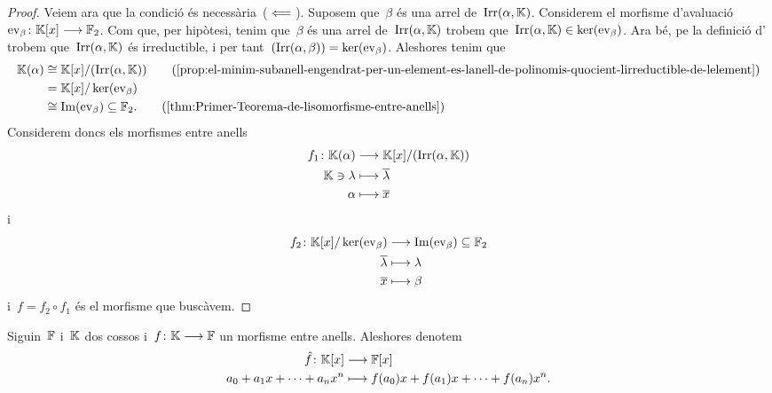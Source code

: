\documentclass[../../main.tex]{subfiles}
\begin{document}
\begin{proof}
        Veiem ara que la condició és necessària~(\(\impliedby\)).
        Suposem que~\(\beta\) és una arrel de~\(\operatorname{Irr}(\alpha,\mathbb{K})\).
        Considerem el morfisme d'avaluació~\(\mathrm{ev}_{\beta}\colon\mathbb{K}[x]\longrightarrow\mathbb{F}_{2}\).
        Com que, per hipòtesi, tenim que~\(\beta\) és una arrel de~\(\operatorname{Irr}(\alpha,\mathbb{K})\) trobem que~\(\operatorname{Irr}(\alpha,\mathbb{K})\in\operatorname{ker}(\mathrm{ev}_{\beta})\).
        Ara bé, pe la definició d' trobem que~\(\operatorname{Irr}(\alpha,\mathbb{K})\) és irreductible, i per tant~\((\operatorname{Irr}(\alpha,\beta))=\operatorname{ker}(\mathrm{ev}_{\beta})\).
        Aleshores tenim que
        \begin{align*}
            \KK(\alpha)&\cong\KK[x]/(\Irr(\alpha,\KK)) \tag{\ref{prop:el-minim-subanell-engendrat-per-un-element-es-lanell-de-polinomis-quocient-lirreductible-de-lelement}}\\
            &=\KK[x]/\ker(\ev_{\beta}) \\
            &\cong\Ima(\ev_{\beta})\subseteq\FF_{2}.
            \tag{\ref{thm:Primer-Teorema-de-lisomorfisme-entre-anells}}
        \end{align*}
        Considerem doncs els morfismes entre anells
        \begin{align*}
            f_{1}\colon\mathbb{K}(\alpha)&\longrightarrow\mathbb{K}[x]/(\operatorname{Irr}(\alpha,\mathbb{K})) \\
            \mathbb{K}\ni\lambda&\longmapsto\overline{\lambda} \\
            \alpha&\longmapsto\overline{x}
        \end{align*}
        i
        \begin{align*}
            f_{2}\colon\mathbb{K}[x]/\operatorname{ker}(\mathrm{ev}_{\beta})&\longrightarrow\operatorname{Im}(\mathrm{ev}_{\beta})\subseteq\mathbb{F}_{2} \\
            \overline{\lambda}&\longmapsto\lambda \\
            \overline{x}&\longmapsto\beta
        \end{align*}
        i~\(f=f_{2}\circ f_{1}\) és el morfisme que buscàvem.
    \end{proof}
    \begin{notation}
        Siguin~\(\mathbb{F}\) i~\(\mathbb{K}\) dos cossos i~\(f\colon\mathbb{K}\longrightarrow\mathbb{F}\) un morfisme entre anells.
        Aleshores denotem
        \begin{align*}
            \hat{f}\colon\mathbb{K}[x]&\longrightarrow\mathbb{F}[x] \\
            a_{0}+a_{1}x+\dots+a_{n}x^{n}&\longmapsto f(a_{0})x+f(a_{1})x+\dots+f(a_{n})x^{n}.
        \end{align*}
    \end{notation}
\end{document}
